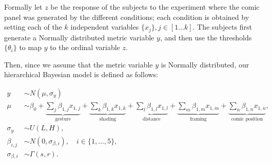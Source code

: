 Formally let $z$ be the response of the subjects to the experiment where the comic panel was generated by the different conditions; each condition is obtained by setting each of the $k$ independent variables $\{x_j\}, j \in [1 \ldots k]$. The subjects first generate a Normally distributed metric variable $y$, and then use the thresholds $\{\theta_i\}$ to map $y$ to the ordinal variable $z$.

Then, since we assume that the metric variable $y$ is Normally distributed, our hierarchical Bayesian model is defined as follows:

\begin{align}
 y     & \sim N(\mu, \sigma_y)                    \label{eq:response-main}                   \\
 \mu    & \sim \beta_0 +
 \underbrace{\sum_{j} \beta_{1,j} x_{1,j}}_{\text{gesture}} +
 \underbrace{\sum_k \beta_{1,k} x_{1,k}}_{\text{shading}} +
 \underbrace{\sum_l \beta_{1,l} x_{1,l}}_{\text{distance}} +
 \underbrace{\sum_m \beta_{1,m} x_{1,m}}_{\text{framing}} +
 \underbrace{\sum_n \beta_{1,n} x_{1,n}}_{\text{comic position}},                  \label{eq:mu-main} \\
\sigma_y & \sim U(L, H), \label{eq:main-sigma} \\
\beta_{i,j} & \sim N(0, \sigma_{\beta, i}), \quad i \in \{1, \dots, 5\},\label{eq:main-beta-sigma}\\
\sigma_{\beta, i} & \sim \Gamma(s, r ). \label{eq:gamma-distribuion}
\end{align}
